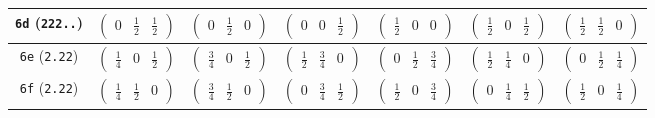 \documentclass[fleqn,9pt,landscape]{jsarticle}
\begin{document}
\begin{center}
\begin{longtable}{ccccccc}
{\tt 6d} ({\tt 222..}) & $ \begin{pmatrix} 0 & \frac{1}{2} & \frac{1}{2} \end{pmatrix} $ & $ \begin{pmatrix} 0 & \frac{1}{2} & 0 \end{pmatrix} $ & $ \begin{pmatrix} 0 & 0 & \frac{1}{2} \end{pmatrix} $ & $ \begin{pmatrix} \frac{1}{2} & 0 & 0 \end{pmatrix} $ & $ \begin{pmatrix} \frac{1}{2} & 0 & \frac{1}{2} \end{pmatrix} $ & $ \begin{pmatrix} \frac{1}{2} & \frac{1}{2} & 0 \end{pmatrix} $ \\ \hline
{\tt 6e} ({\tt 2.22}) & $ \begin{pmatrix} \frac{1}{4} & 0 & \frac{1}{2} \end{pmatrix} $ & $ \begin{pmatrix} \frac{3}{4} & 0 & \frac{1}{2} \end{pmatrix} $ & $ \begin{pmatrix} \frac{1}{2} & \frac{3}{4} & 0 \end{pmatrix} $ & $ \begin{pmatrix} 0 & \frac{1}{2} & \frac{3}{4} \end{pmatrix} $ & $ \begin{pmatrix} \frac{1}{2} & \frac{1}{4} & 0 \end{pmatrix} $ & $ \begin{pmatrix} 0 & \frac{1}{2} & \frac{1}{4} \end{pmatrix} $ \\ \hline
{\tt 6f} ({\tt 2.22}) & $ \begin{pmatrix} \frac{1}{4} & \frac{1}{2} & 0 \end{pmatrix} $ & $ \begin{pmatrix} \frac{3}{4} & \frac{1}{2} & 0 \end{pmatrix} $ & $ \begin{pmatrix} 0 & \frac{3}{4} & \frac{1}{2} \end{pmatrix} $ & $ \begin{pmatrix} \frac{1}{2} & 0 & \frac{3}{4} \end{pmatrix} $ & $ \begin{pmatrix} 0 & \frac{1}{4} & \frac{1}{2} \end{pmatrix} $ & $ \begin{pmatrix} \frac{1}{2} & 0 & \frac{1}{4} \end{pmatrix} $ \\ \hline

\end{longtable}
\end{center}
\end{document}
